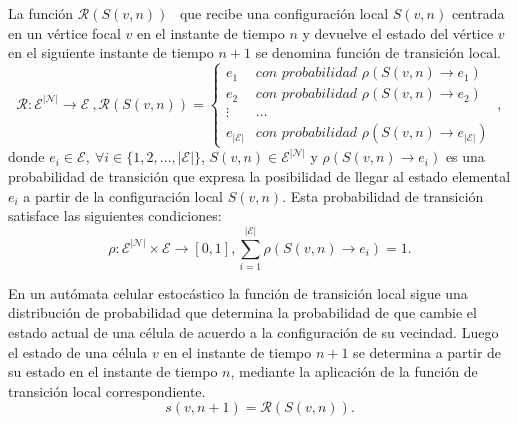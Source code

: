 \begin{definition}
\label{def-local-func}
La funci\'on $\mathcal{R}(S(v,n))$~\cite{book} que recibe una configuraci\'on local $S(v,n)$ centrada en un v\'ertice focal $v$ en el instante de tiempo $n$ y devuelve el estado del v\'ertice $v$ en el siguiente instante de tiempo $n+1$ se denomina funci\'on de transici\'on local. 
\begin{subequations}
\begin{equation}
\boxed{\mathcal{R}:\mathcal{E}^{|\mathcal{N}|} \rightarrow \mathcal{E}}~, \label{eq-local-func}
\end{equation}
\begin{equation}
\boxed{\mathcal{R}(S(v,n)) = \left\lbrace
	\begin{array}{lc}
		e_1& \textit{con probabilidad } \rho(S(v,n) \rightarrow e_1)\\
		e_2& \textit{con probabilidad } \rho(S(v,n) \rightarrow e_2)\\
		\vdots & \ldots\\
		e_{|\mathcal{E}|}& \textit{con probabilidad } \rho(S(v,n) \rightarrow e_{|\mathcal{E}|})
	\end{array}
\right.}~, \label{eq-local-func-2}
\end{equation}
\end{subequations}
donde $e_i \in \mathcal{E},~\forall i \in \lbrace 1,2,\ldots,|\mathcal{E}| \rbrace$, $S(v,n) \in \mathcal{E}^{|\mathcal{N}|}$ y $\rho(S(v,n) \rightarrow e_i)$ es una probabilidad de transici\'on que expresa la posibilidad de llegar al estado elemental $e_i$ a partir de la configuraci\'on local $S(v,n)$. Esta probabilidad de transici\'on satisface las siguientes condiciones:
\begin{subequations}
\begin{equation}
\rho:\mathcal{E}^{|\mathcal{N}|} \times \mathcal{E} \rightarrow [0,1], \label{eq-w} 
\end{equation}
\begin{equation}
\sum_{i=1}^{|\mathcal{E}|}\rho(S(v,n) \rightarrow e_i) = 1. \label{eq-w-sum}
\end{equation}
\end{subequations}
\end{definition}

En un aut\'omata celular estoc\'astico la funci\'on de transici\'on local sigue una distribuci\'on de probabilidad que determina la probabilidad de que cambie el estado actual de una c\'elula de acuerdo a la configuraci\'on de su vecindad. Luego el estado de una c\'elula $v$ en el instante de tiempo $n+1$ se determina a partir de su estado en el instante de tiempo $n$, mediante la aplicaci\'on de la funci\'on de transici\'on local correspondiente.
\begin{equation}
s(v,n+1) = \mathcal{R}(S(v,n)). \label{eq-local-func-3}
\end{equation}

